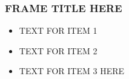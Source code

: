 \documentclass{beamer}
\begin{document}
  \begin{frame}
    \frametitle{FRAME TITLE HERE}
    \begin{itemize}
       \item {} TEXT FOR ITEM 1\footnotemark
       \item {} TEXT FOR ITEM 2\footnotemark
       \item {} TEXT FOR ITEM 3 HERE
    \end{itemize}
  \end{frame}
\end{document}
